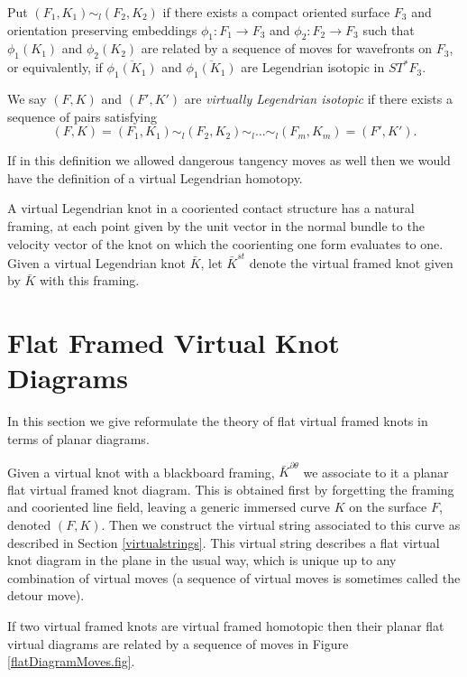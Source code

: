 Put $(F_1, K_1) \sim_l (F_2, K_2)$ if there exists a compact oriented surface $F_3$ and orientation preserving embeddings $\phi_1: F_1\rightarrow F_3$ and $\phi_2: F_2\rightarrow F_3$ such that $\phi_1(K_1)$ and $\phi_2(K_2)$ are related by a sequence of moves for wavefronts on $F_3$, or equivalently, if $\overline{\phi_1(K_1)}$ and $\overline{\phi_1(K_1)}$ are Legendrian isotopic in $ST^*F_3$.  

We say $(F,K)$ and $(F',K')$ are {\it virtually Legendrian isotopic} if there exists a sequence of pairs satisfying  $$(F,K)=(F_1,K_1)\sim_l (F_2, K_2)\sim_l \dots \sim_l (F_m,K_m)=(F',K').$$

\begin{rem} If in this definition we allowed dangerous tangency moves as well then we would have the definition of a virtual Legendrian homotopy.
\end{rem}

\begin{rem} \label{stdFraming} A virtual Legendrian knot in a cooriented contact structure has a natural framing, at each point given by the unit vector in the normal bundle to the velocity vector of the knot on which the coorienting one form evaluates to one.  Given a virtual Legendrian knot $\bar{K}$, let $\bar{K}^{st}$ denote the virtual framed knot given by $\bar{K}$ with this framing.
\end{rem}



\section{Flat Framed Virtual Knot Diagrams}\label{flatframed}
In this section we give reformulate the theory of flat virtual framed knots in terms of planar diagrams.

Given a virtual knot with a blackboard framing, $\bar{K}^{\partial \theta}$ we associate to it a planar flat virtual framed knot diagram.  This is obtained first by forgetting the framing and cooriented line field, leaving a generic immersed curve $K$ on the surface $F$, denoted $(F, K)$. Then we construct the   virtual string associated to this curve as described in Section \ref{virtualstrings}.  This virtual string describes a flat virtual knot diagram in the plane in the usual way, which is unique up to any combination of virtual moves (a sequence of virtual moves is sometimes called the detour move).



If two virtual framed knots are virtual framed homotopic then their planar flat virtual diagrams are related by a sequence of moves in Figure \ref{flatDiagramMoves.fig}.

